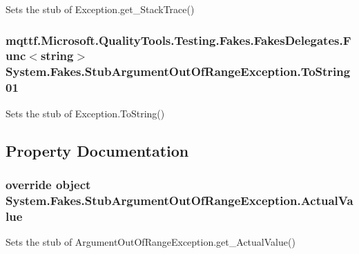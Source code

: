 Sets the stub of Exception.\-get\-\_\-\-Stack\-Trace()

\hypertarget{class_system_1_1_fakes_1_1_stub_argument_out_of_range_exception_afdece98f73c24949a7a3c497a88f2e2a}{
\subsubsection[{To\-String01}]{\setlength{\rightskip}{0pt plus 5cm}mqttf.\-Microsoft.\-Quality\-Tools.\-Testing.\-Fakes.\-Fakes\-Delegates.\-Func$<$string$>$ System.\-Fakes.\-Stub\-Argument\-Out\-Of\-Range\-Exception.\-To\-String01}}\label{class_system_1_1_fakes_1_1_stub_argument_out_of_range_exception_afdece98f73c24949a7a3c497a88f2e2a}


Sets the stub of Exception.\-To\-String()



\subsection{Property Documentation}
\hypertarget{class_system_1_1_fakes_1_1_stub_argument_out_of_range_exception_a03c824aefcfd70133ed19ec70f15445d}{
\subsubsection[{Actual\-Value}]{\setlength{\rightskip}{0pt plus 5cm}override object System.\-Fakes.\-Stub\-Argument\-Out\-Of\-Range\-Exception.\-Actual\-Value\hspace{0.3cm}{\ttfamily [get]}}}\label{class_system_1_1_fakes_1_1_stub_argument_out_of_range_exception_a03c824aefcfd70133ed19ec70f15445d}


Sets the stub of Argument\-Out\-Of\-Range\-Exception.\-get\-\_\-\-Actual\-Value()


